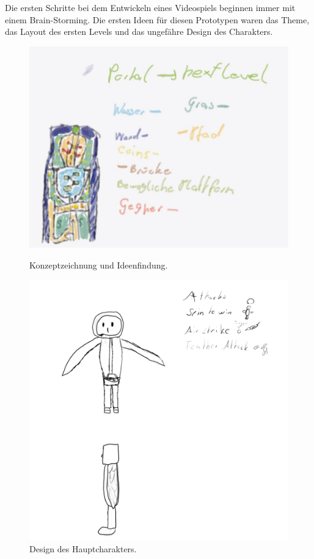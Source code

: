 Die ersten Schritte bei dem Entwickeln eines Videospiels beginnen immer mit einem Brain-Storming. Die ersten Ideen für diesen Prototypen waren das Theme, das Layout des ersten Levels und das ungefähre Design des Charakters.

\begin{figure}[h]
  \centering
  \begin{minipage}[b]{0.45\textwidth}
    \centering
    \includegraphics[width=\textwidth]{chapters/04/images/V1/drawing.jpg}
    \caption{Konzeptzeichnung und Ideenfindung.}
    \label{fig:PE01}
  \end{minipage}
  \hfill
  \begin{minipage}[b]{0.45\textwidth}
    \centering
    \includegraphics[width=\textwidth]{chapters/04/images/V1/CharScetch.png}
    \caption{Design des Hauptcharakters.}
    \label{fig:PE02}
  \end{minipage}
\end{figure}

